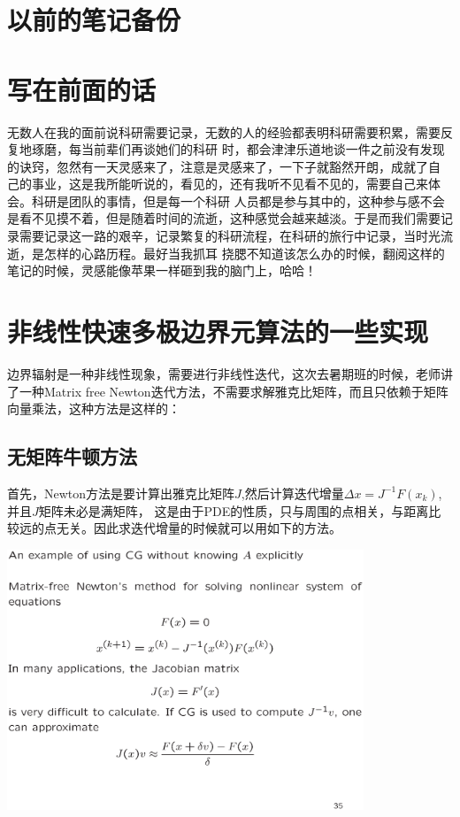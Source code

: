 
	
\section{以前的笔记备份}
\section*{写在前面的话}
无数人在我的面前说科研需要记录，无数的人的经验都表明科研需要积累，需要反复地琢磨，每当前辈们再谈她们的科研
时，都会津津乐道地谈一件之前没有发现的诀窍，忽然有一天灵感来了，注意是灵感来了，一下子就豁然开朗，成就了自
己的事业，这是我所能听说的，看见的，还有我听不见看不见的，需要自己来体会。科研是团队的事情，但是每一个科研
人员都是参与其中的，这种参与感不会是看不见摸不着，但是随着时间的流逝，这种感觉会越来越淡。于是而我们需要记
录需要记录这一路的艰辛，记录繁复的科研流程，在科研的旅行中记录，当时光流逝，是怎样的心路历程。最好当我抓耳
挠腮不知道该怎么办的时候，翻阅这样的笔记的时候，灵感能像苹果一样砸到我的脑门上，哈哈！

\newpage
\section{非线性快速多极边界元算法的一些实现}
边界辐射是一种非线性现象，需要进行非线性迭代，这次去暑期班的时候，老师讲了一种Matrix free Newton迭代方法，不需要求解雅克比矩阵，而且只依赖于矩阵向量乘法，这种方法是这样的：

\subsection{无矩阵牛顿方法}
首先，Newton方法是要计算出雅克比矩阵$J$,然后计算迭代增量$\Delta x = J^{-1}F(x_k)$,并且$J$矩阵未必是满矩阵，
这是由于PDE的性质，只与周围的点相关，与距离比较远的点无关。因此求迭代增量的时候就可以用如下的方法。
	\begin{center}
		\includegraphics[width=0.8\textwidth]{pics/Matrixfreenewtonmethod.eps}
	\end{center}

